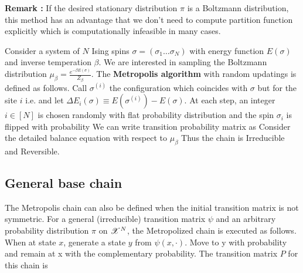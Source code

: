 \documentclass[letterpaper,english,10pt]{article}
\begin{document}
\textbf{Remark :} If the desired stationary distribution $\pi$ is a Boltzmann distribution, this method has an advantage that we don't need to compute partition function explicitly which is computationally infeasible in many cases.
\begin{shaded}
\begin{exmp}
Consider a system of $N$ Ising spins $\sigma = (\sigma_1 \dots \sigma_N)$ with energy function $E(\sigma)$ and inverse temperation $\beta$. We are interested in sampling the Boltzmann distribution $\mu_\beta = \frac{e^{-\beta E(\sigma)}}{Z_\beta}$. The \textbf{Metropolis algorithm} with random updatings is defined as follows. Call $\sigma^{(i)}$ the configuration which coincides with $\sigma$ but for the site $i$ i.e.   
  and let $\Delta E_i(\sigma) \equiv E(\sigma^{(i)}) - E(\sigma)$. At each step, an integer $i \in [N]$ is chosen randomly with flat probability distribution and the spin $\sigma_i$ is flipped with probability
We can write transition probability matrix as
Consider the detailed balance equation with respect to $\mu_\beta$
Thus the chain is Irreducible and Reversible.
\end{exmp}
\end{shaded}
\subsection{General base chain}
The Metropolis chain can also be defined when the initial transition matrix is not symmetric. For a general (irreducible) transition matrix $\psi$ and an arbitrary probability distribution $\pi$ on $\mathscr{X}^N$, the Metropolized chain is executed as follows. When at state $x$, generate a state $y$ from $\psi(x,\cdot)$. Move to y with probability
 and remain at x with  the complementary probability. The transition matrix $P$ for this chain is
	
\end{document}

